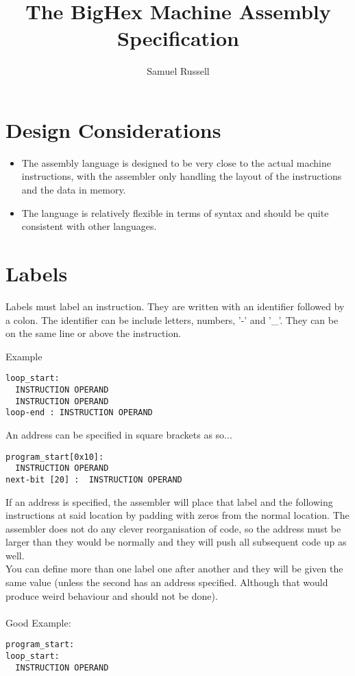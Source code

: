 \documentclass[10pt,a4paper]{article}
\author{Samuel Russell}
\title{The BigHex Machine Assembly Specification}
\begin{document}
\maketitle


\section{Design Considerations}
\begin{itemize}
  \item The assembly language is designed to be very close to the actual machine instructions, with the assembler only  handling the layout of the instructions and the data in memory.
  \item The language is relatively flexible in terms of syntax and should be quite consistent with other languages.
\end{itemize}
 

\section{Labels}

Labels must label an instruction. They are written with an identifier followed by a colon. The identifier can be include letters, numbers, '-' and '\_'. They can be on the same line or above the instruction.


\noindent Example
\begin{lstlisting}[frame=single]
loop_start:
  INSTRUCTION OPERAND
  INSTRUCTION OPERAND
loop-end : INSTRUCTION OPERAND
\end{lstlisting}

An address can be specified in square brackets as so...

\begin{lstlisting}[frame=single]
program_start[0x10]:
  INSTRUCTION OPERAND
next-bit [20] :  INSTRUCTION OPERAND
\end{lstlisting}


If an address is specified, the assembler will place that label and the following instructions at said location by padding with zeros from the normal location. The assembler does not do any clever reorganisation of code, so the address must be larger than they would be normally and they will push all subsequent code up as well.\\

You can define more than one label one after another and they will be given the same value (unless the second has an address specified. Although that would produce weird behaviour and should not be done).
\\\\
\noindent Good Example:
\begin{lstlisting}[frame=single]
program_start:
loop_start:
  INSTRUCTION OPERAND
\end{lstlisting}
\end{document}
